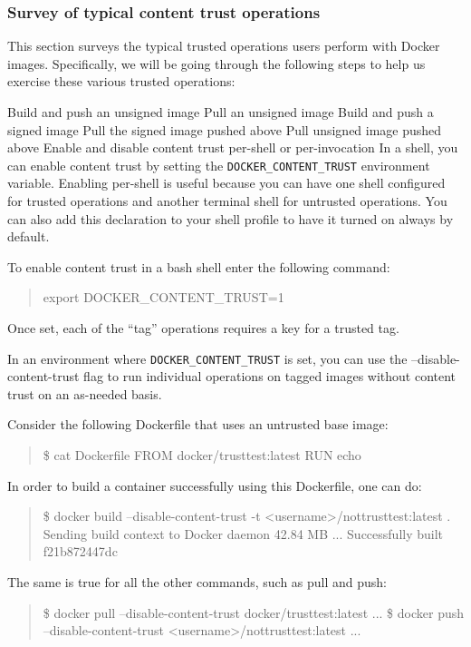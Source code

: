 \subsubsection{Survey of typical content trust operations}
This section surveys the typical trusted operations users perform with
Docker images. Specifically, we will be going through the following steps
to help us exercise these various trusted operations:

Build and push an unsigned image
Pull an unsigned image
Build and push a signed image
Pull the signed image pushed above
Pull unsigned image pushed above
Enable and disable content trust per-shell or per-invocation
In a shell, you can enable content trust by setting the
{\tt DOCKER\_CONTENT\_TRUST} environment variable. Enabling per-shell is useful
because you can have one shell configured for trusted operations and
another terminal shell for untrusted operations. You can also add this
declaration to your shell profile to have it turned on always by default.

To enable content trust in a bash shell enter the following command:

\begin{quote}
export DOCKER\_CONTENT\_TRUST=1
\end{quote}

Once set, each of the “tag” operations requires a key for a trusted tag.

In an environment where {\tt DOCKER\_CONTENT\_TRUST} is set, you can use the
--disable-content-trust flag to run individual operations on tagged images
without content trust on an as-needed basis.

Consider the following Dockerfile that uses an untrusted base image:

\begin{quote}
\$  cat Dockerfile
FROM docker/trusttest:latest
RUN echo
\end{quote}

In order to build a container successfully using this Dockerfile, one can
do:

\begin{quote}
\$  docker build --disable-content-trust -t <username>/nottrusttest:latest .
Sending build context to Docker daemon 42.84 MB
...
Successfully built f21b872447dc
\end{quote}

The same is true for all the other commands, such as pull and push:

\begin{quote}
\$  docker pull --disable-content-trust docker/trusttest:latest
...
\$  docker push --disable-content-trust <username>/nottrusttest:latest
...
\end{quote}


